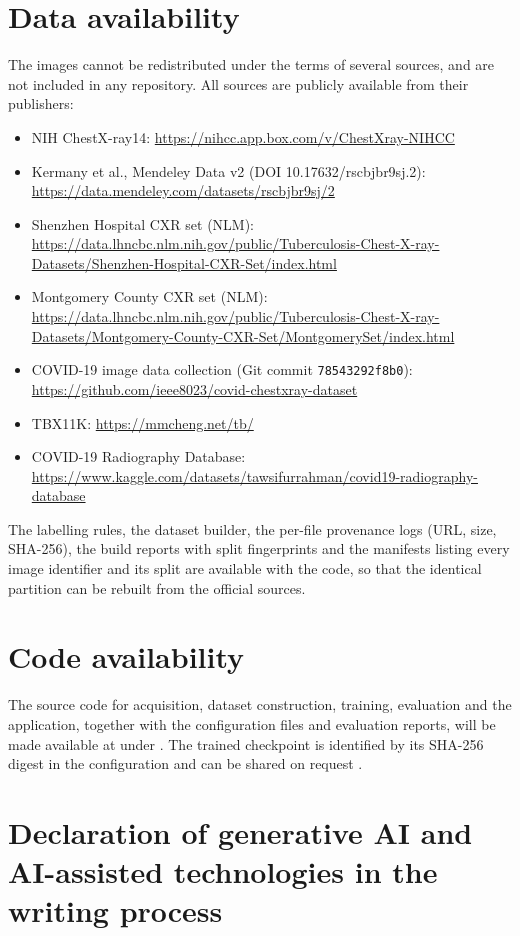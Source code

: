 \section*{Data availability}
The images cannot be redistributed under the terms of several sources, and are not included in any repository. All sources are publicly available from their publishers:
\begin{itemize}
\item NIH ChestX-ray14: \url{https://nihcc.app.box.com/v/ChestXray-NIHCC}
\item Kermany et al., Mendeley Data v2 (DOI 10.17632/rscbjbr9sj.2): \url{https://data.mendeley.com/datasets/rscbjbr9sj/2}
\item Shenzhen Hospital CXR set (NLM): \url{https://data.lhncbc.nlm.nih.gov/public/Tuberculosis-Chest-X-ray-Datasets/Shenzhen-Hospital-CXR-Set/index.html}
\item Montgomery County CXR set (NLM): \url{https://data.lhncbc.nlm.nih.gov/public/Tuberculosis-Chest-X-ray-Datasets/Montgomery-County-CXR-Set/MontgomerySet/index.html}
\item COVID-19 image data collection (Git commit \texttt{78543292f8b0}): \url{https://github.com/ieee8023/covid-chestxray-dataset}
\item TBX11K: \url{https://mmcheng.net/tb/}
\item COVID-19 Radiography Database: \url{https://www.kaggle.com/datasets/tawsifurrahman/covid19-radiography-database}
\end{itemize}
The labelling rules, the dataset builder, the per-file provenance logs (URL, size, SHA-256), the build reports with split fingerprints and the manifests listing every image identifier and its split are available with the code, so that the identical partition can be rebuilt from the official sources.

\section*{Code availability}
The source code for acquisition, dataset construction, training, evaluation and the application, together with the configuration files and evaluation reports, will be made available at  under . The trained checkpoint is identified by its SHA-256 digest in the configuration and can be shared on request .

\section*{Declaration of generative AI and AI-assisted technologies in the writing process}

